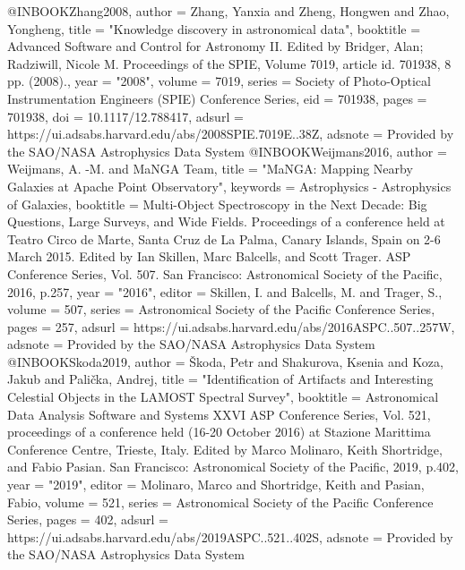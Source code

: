 @INBOOK{Zhang2008,
       author = {{Zhang}, Yanxia and {Zheng}, Hongwen and {Zhao}, Yongheng},
        title = "{Knowledge discovery in astronomical data}",
    booktitle = {Advanced Software and Control for Astronomy II. Edited by Bridger, Alan; Radziwill, Nicole M. Proceedings of the SPIE, Volume 7019, article id. 701938, 8 pp. (2008).},
         year = "2008",
       volume = {7019},
       series = {Society of Photo-Optical Instrumentation Engineers (SPIE) Conference Series},
          eid = {701938},
        pages = {701938},
          doi = {10.1117/12.788417},
       adsurl = {https://ui.adsabs.harvard.edu/abs/2008SPIE.7019E..38Z},
      adsnote = {Provided by the SAO/NASA Astrophysics Data System}
}
@INBOOK{Weijmans2016,
       author = {{Weijmans}, A. -M. and {MaNGA Team}},
        title = "{MaNGA: Mapping Nearby Galaxies at Apache Point Observatory}",
     keywords = {Astrophysics - Astrophysics of Galaxies},
    booktitle = {Multi-Object Spectroscopy in the Next Decade: Big Questions, Large Surveys, and Wide Fields. Proceedings of a conference held at Teatro Circo de Marte, Santa Cruz de La Palma, Canary Islands, Spain on 2-6 March 2015. Edited by Ian Skillen, Marc Balcells, and Scott Trager.  ASP Conference Series, Vol. 507.  San Francisco: Astronomical Society of the Pacific, 2016, p.257},
         year = "2016",
       editor = {{Skillen}, I. and {Balcells}, M. and {Trager}, S.},
       volume = {507},
       series = {Astronomical Society of the Pacific Conference Series},
        pages = {257},
       adsurl = {https://ui.adsabs.harvard.edu/abs/2016ASPC..507..257W},
      adsnote = {Provided by the SAO/NASA Astrophysics Data System}
}
@INBOOK{Skoda2019,
       author = {{{\v{S}}koda}, Petr and {Shakurova}, Ksenia and {Koza}, Jakub and
         {Pali{\v{c}}ka}, Andrej},
        title = "{Identification of Artifacts and Interesting Celestial Objects in the LAMOST Spectral Survey}",
    booktitle = {Astronomical Data Analysis Software and Systems XXVI ASP Conference Series, Vol. 521, proceedings of a conference held (16-20 October 2016) at Stazione Marittima Conference Centre, Trieste, Italy. Edited by Marco Molinaro, Keith Shortridge, and Fabio Pasian. San Francisco: Astronomical Society of the Pacific, 2019, p.402},
         year = "2019",
       editor = {{Molinaro}, Marco and {Shortridge}, Keith and {Pasian}, Fabio},
       volume = {521},
       series = {Astronomical Society of the Pacific Conference Series},
        pages = {402},
       adsurl = {https://ui.adsabs.harvard.edu/abs/2019ASPC..521..402S},
      adsnote = {Provided by the SAO/NASA Astrophysics Data System}
}

